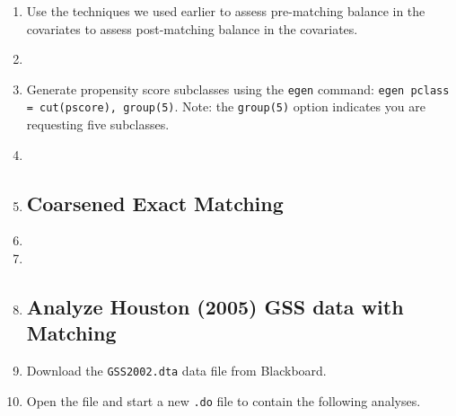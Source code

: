 \documentclass[a4paper,12pt]{article}
\begin{document}
\begin{enumerate}
\item Use the techniques we used earlier to assess pre-matching balance in the covariates to assess post-matching balance in the covariates.

\item %



\item Generate propensity score subclasses using the \texttt{egen} command: \texttt{egen pclass = cut(pscore), group(5)}. Note: the \texttt{group(5)} option indicates you are requesting five subclasses.



\item %
\item %


\subsection*{Coarsened Exact Matching}

\item %
\item %
\item %



\subsection*{Analyze Houston (2005) GSS data with Matching}

\item Download the \texttt{GSS2002.dta} data file from Blackboard.
\item Open the file and start a new \texttt{.do} file to contain the following analyses.


\end{enumerate}
\end{document}
